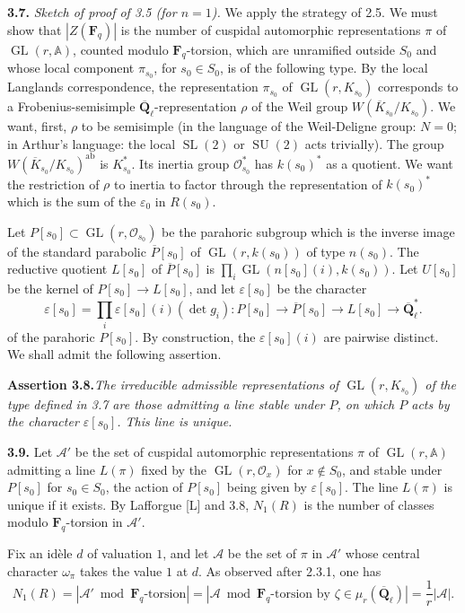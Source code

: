 \documentclass[11pt]{article}
\newcommand{\Fq}{\mathbf{F}_q}
\newcommand{\Qbl}{\overline{\mathbf{Q}}_{\ell}}
\newcommand{\GL}{\operatorname{GL}}
\newcommand{\Acal}{\mathcal{A}}
\newcommand{\Adele}{\mathbb{A}}
\newcommand{\SL}{\operatorname{SL}}
\newcommand{\SU}{\operatorname{SU}}
\newcommand{\para}[1]{\medskip\noindent\textbf{#1}\enspace}
\begin{document}
\para{3.7.} \textit{Sketch of proof of 3.5 (for \(n=1\)).} We apply the strategy of 2.5. We must show that \(|Z(\Fq)|\) is the number of cuspidal automorphic representations \(\pi\) of \(\GL(r,\Adele)\), counted modulo \(\Fq\)-torsion, which are unramified outside \(S_0\) and whose local component \(\pi_{s_0}\), for \(s_0\in S_0\), is of the following type. By the local Langlands correspondence, the representation \(\pi_{s_0}\) of \(\GL(r,K_{s_0})\) corresponds to a Frobenius-semisimple \(\Qbl\)-representation \(\rho\) of the Weil group \(W(\overline K_{s_0}/K_{s_0})\). We want, first, \(\rho\) to be semisimple (in the language of the Weil-Deligne group: \(N=0\); in Arthur's language: the local \(\SL(2)\) or \(\SU(2)\) acts trivially). The group \(W(\overline K_{s_0}/K_{s_0})^{\mathrm{ab}}\) is \(K_{s_0}^*\). Its inertia group \(\mathcal O_{s_0}^*\) has \(k(s_0)^*\) as a quotient. We want the restriction of \(\rho\) to inertia to factor through the representation of \(k(s_0)^*\) which is the sum of the \(\varepsilon_0\) in \(R(s_0)\).

Let \(P[s_0]\subset \GL(r,\mathcal O_{s_0})\) be the parahoric subgroup which is the inverse image of the standard parabolic \(\overline P[s_0]\) of \(\GL(r,k(s_0))\) of type \(n(s_0)\). The reductive quotient \(L[s_0]\) of \(\overline P[s_0]\) is \(\prod_i\GL(n[s_0](i),k(s_0))\). Let \(U[s_0]\) be the kernel of \(P[s_0]\to L[s_0]\), and let \(\varepsilon[s_0]\) be the character
\[
  \varepsilon[s_0]=\prod_i\varepsilon[s_0](i)(\det g_i):P[s_0]\to\overline P[s_0]\to L[s_0]\to\Qbl^*.
\]
of the parahoric \(P[s_0]\). By construction, the \(\varepsilon[s_0](i)\) are pairwise distinct. We shall admit the following assertion.

\noindent\textbf{Assertion 3.8.}\quad\textit{The irreducible admissible representations of \(\GL(r,K_{s_0})\) of the type defined in 3.7 are those admitting a line stable under \(P\), on which \(P\) acts by the character \(\varepsilon[s_0]\). This line is unique.}

\para{3.9.} Let \(\Acal'\) be the set of cuspidal automorphic representations \(\pi\) of \(\GL(r,\Adele)\) admitting a line \(L(\pi)\) fixed by the \(\GL(r,\mathcal O_x)\) for \(x\notin S_0\), and stable under \(P[s_0]\) for \(s_0\in S_0\), the action of \(P[s_0]\) being given by \(\varepsilon[s_0]\). The line \(L(\pi)\) is unique if it exists. By Lafforgue [L] and 3.8, \(N_1(R)\) is the number of classes modulo \(\Fq\)-torsion in \(\Acal'\).

Fix an idèle \(d\) of valuation \(1\), and let \(\Acal\) be the set of \(\pi\) in \(\Acal'\) whose central character \(\omega_\pi\) takes the value \(1\) at \(d\). As observed after 2.3.1, one has
\begin{equation}
  N_1(R)=|\Acal'\bmod \Fq\text{-torsion}|=|\Acal\bmod \Fq\text{-torsion by }\zeta\in\mu_r(\Qbl)|=\frac{1}{r}|\Acal|.
\tag{3.9.1}
\end{equation}
\end{document}
